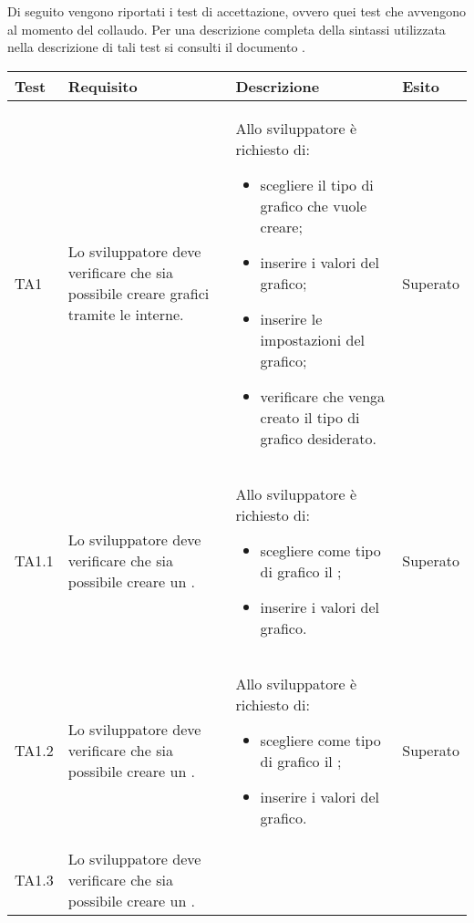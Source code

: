 	Di seguito vengono riportati i test di accettazione, ovvero quei test che avvengono al momento del collaudo. Per una descrizione completa della sintassi utilizzata nella descrizione di tali test si consulti il documento .

	\begin{longtabu}{| X[0.5] | X | X | X[0.5] |}

	\hline
	\rowfont{\bf}
	Test &
	Requisito &
	Descrizione &
	Esito \\
	\hline \endhead

	TA1 & Lo sviluppatore deve verificare che sia possibile creare grafici tramite le  interne.
	 
		& Allo sviluppatore è richiesto di:
		\begin{itemize}
			\item scegliere il tipo di grafico che vuole creare;
			\item inserire i valori del grafico;
			\item inserire le impostazioni del grafico;
			\item verificare che venga creato il tipo di grafico desiderato.
		\end{itemize}
& Superato \\ \hline

	TA1.1 & Lo sviluppatore deve verificare che sia possibile creare un .

		& Allo sviluppatore è richiesto di:
		\begin{itemize}
			\item scegliere come tipo di grafico il ;
			\item inserire i valori del grafico.
		\end{itemize}
& Superato \\ \hline

	TA1.2 & Lo sviluppatore deve verificare che sia possibile creare un .

		& Allo sviluppatore è richiesto di:
		\begin{itemize}
			\item scegliere come tipo di grafico il ;
			\item inserire i valori del grafico.
		\end{itemize}
& Superato \\ \hline

	TA1.3 & Lo sviluppatore deve verificare che sia possibile creare un .


\end{longtabu}
